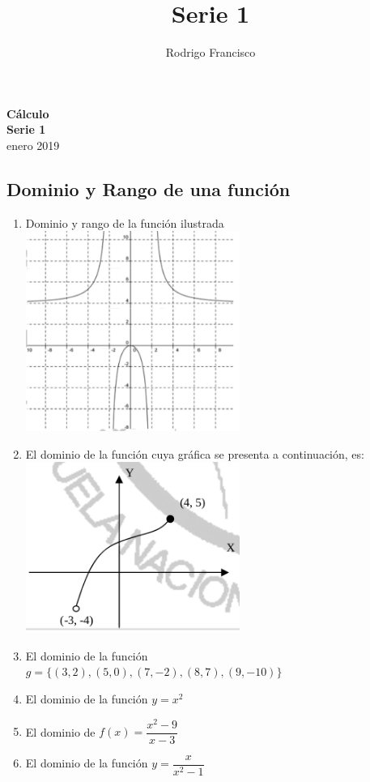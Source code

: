 \documentclass[10pt,a4paper]{article}
\author{Rodrigo Francisco}
\title{Serie 1}
\begin{document}
	\begin{center}
	{\LARGE \bf Cálculo}\\
	{\large  \bf Serie 1}\\
	enero 2019
	\end{center}
\begin{multicols*}{2} 	
	\section{Dominio y Rango de una función}	
	
    
        \begin{enumerate}
            \item Dominio y rango de la función ilustrada            						\includegraphics[width=7cm]{img/s1-35}
            \item El dominio de la función cuya gráfica se presenta a 		continuación, es:
            \includegraphics[width=7cm]{img/s1-38}
            \item El dominio de la función \\ $g=\{(3,2),(5,0),(7,-2),(8,7),(9,-10)\}$
            \item El dominio de la función $y=x^2$
            \item El dominio de $f(x) = \dfrac{x^2-9}{x-3}$
            \item El dominio de la función $y=\dfrac{x}{x^2-1}$

\end{enumerate}
\end{multicols*}
\end{document}
